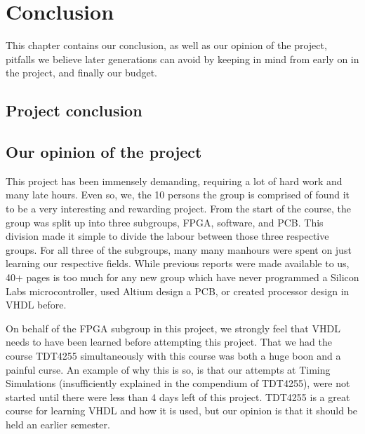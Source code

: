 
\chapter{Conclusion}

This chapter contains our conclusion, as well as our opinion of the project,
pitfalls we believe later generations can avoid by keeping in mind from early on
in the project, and finally our budget.

\clearpage
\section{Project conclusion}

\clearpage


\clearpage
\section{Our opinion of the project}

This project has been immensely demanding, requiring a lot of hard work and many
late hours. Even so, we, the 10 persons the group is comprised of found it to be
a very interesting and rewarding project. From the start of the course, the
group was split up into three subgroups, FPGA, software, and PCB. This division
made it simple to divide the labour between those three respective groups. For
all three of the subgroups, many many manhours were spent on just learning our
respective fields. While previous reports were made available to us, 40+ pages
is too much for any new group which have never programmed a Silicon Labs
microcontroller, used Altium design a PCB, or created processor design in VHDL
before.

On behalf of the FPGA subgroup in this project, we strongly feel that VHDL needs
to have been learned before attempting this project. That we had the course
TDT4255\cite{tdt4255} simultaneously with this course was both a huge boon and a
painful curse. An example of why this is so, is that our attempts at Timing
Simulations (insufficiently explained in the compendium\cite{tdt4255-compendium}
of TDT4255), were not started until there were less than 4 days left of this
project. TDT4255 is a great course for learning VHDL and how it is used, but our
opinion is that it should be held an earlier semester.

